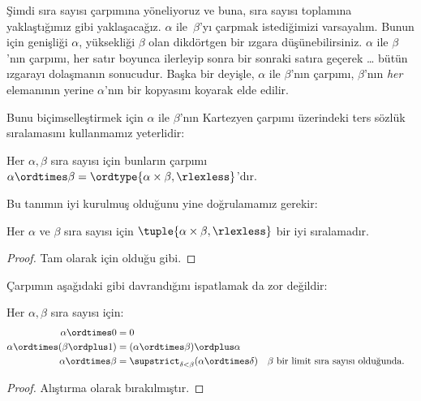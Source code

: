 \documentclass[../../../include/open-logic-section]{subfiles}
\begin{document}


Şimdi sıra sayısı çarpımına yöneliyoruz ve buna, sıra sayısı toplamına
yaklaştığımız gibi yaklaşacağız. $\alpha$ ile~$\beta$'yı çarpmak
istediğimizi varsayalım. Bunun için genişliği $\alpha$, yüksekliği $\beta$
olan dikdörtgen bir ızgara düşünebilirsiniz. $\alpha$ ile $\beta$'nın
çarpımı, her satır boyunca ilerleyip sonra bir sonraki satıra geçerek
\ldots{} bütün ızgarayı dolaşmanın sonucudur. Başka bir deyişle, $\alpha$
ile $\beta$'nın çarpımı, $\beta$'nın \emph{her} elemanının yerine
$\alpha$'nın bir kopyasını koyarak elde edilir.

Bunu biçimselleştirmek için $\alpha$ ile $\beta$'nın Kartezyen çarpımı
üzerindeki ters sözlük sıralamasını kullanmamız yeterlidir:

\begin{defn}
Her $\alpha,\beta$ sıra sayısı için bunların çarpımı
$\alpha\ordtimes\beta=\ordtype{\alpha\times\beta,\rlexless}$'dır.
\end{defn}
\noindent
Bu tanımın iyi kurulmuş olduğunu yine doğrulamamız gerekir:

\begin{lem}
Her $\alpha$ ve $\beta$ sıra sayısı için
$\tuple{\alpha\times\beta,\rlexless}$ bir iyi sıralamadır.
\end{lem}

\begin{proof}
Tam olarak  için olduğu gibi.
\end{proof}
\noindent
Çarpımın aşağıdaki gibi davrandığını ispatlamak da zor değildir:

\begin{lem}
Her $\alpha,\beta$ sıra sayısı için:
\begin{align*}
	\alpha \ordtimes 0 &= 0\\
	\alpha \ordtimes (\beta \ordplus 1) &= 
		(\alpha \ordtimes \beta) \ordplus \alpha\\
	\alpha  \ordtimes \beta &= 
		\supstrict_{\delta < \beta}(\alpha \ordtimes \delta) && 
		\text{$\beta$ bir limit sıra sayısı olduğunda.}
\end{align*}
\end{lem}

\begin{proof}
Alıştırma olarak bırakılmıştır.
\end{proof}
\end{document}
